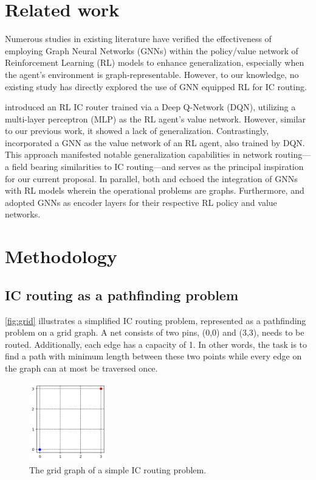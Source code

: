 \documentclass[letterpaper]{article}
\begin{document}
\section{Related work}
Numerous studies in existing literature have verified the effectiveness of employing Graph Neural Networks (GNNs) within the policy/value network of Reinforcement Learning (RL) models to enhance generalization, especially when the agent’s environment is graph-representable. However, to our knowledge, no existing study has directly explored the use of GNN equipped RL for IC routing.

\cite{Liao2020} introduced an RL IC router trained via a Deep Q-Network (DQN), utilizing a multi-layer perceptron (MLP) as the RL agent's value network. However, similar to our previous work, it showed a lack of generalization. Contrastingly, \cite{Almasan2022} incorporated a GNN as the value network of an RL agent, also trained by DQN. This approach manifested notable generalization capabilities in network routing—a field bearing similarities to IC routing—and serves as the principal inspiration for our current proposal. In parallel, both \cite{Chen2023} and \cite{Wang2018} echoed the integration of GNNs with RL models wherein the operational problems are graphs. Furthermore, \cite{Mirhoseini2021} and \cite{Yue2022} adopted GNNs as encoder layers for their respective RL policy and value networks.

    
\section{Methodology}

\subsection{IC routing as a pathfinding problem}
\autoref{fig:grid} illustrates a simplified IC routing problem, represented as a pathfinding problem on a grid graph. A net consists of two pins, (0,0) and (3,3), needs to be routed. Additionally, each edge has a capacity of 1. In other words, the task is to find a path with minimum length between these two points while every edge on the graph can at most be traversed once.

\begin{figure}[h!]
    \centering
    \includegraphics[width=0.3\textwidth]{figure/grid_grap.png}
    \caption{The grid graph of a simple IC routing problem.}
    \label{fig:grid}
\end{figure}
\end{document}
